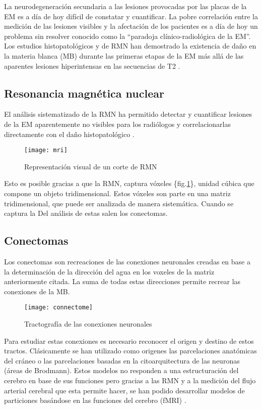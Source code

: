 \documentclass[fleqn,10pt]{UICArticle} %
\begin{document}
La neurodegeneración secundaria a las lesiones provocadas por las placas de la EM es a día de hoy difícil de constatar y cuantificar. La pobre correlación entre la medición de las lesiones visibles y la afectación de los pacientes es a día de hoy un problema sin resolver conocido como la “paradoja clínico-radiológica de la EM”. Los estudios histopatológicos y de RMN han demostrado la existencia de daño en la materia blanca (MB) durante las primeras etapas de la EM más allá de las aparentes lesiones hiperintensas en las secuencias de T2 \cite{Beer2016}.

\subsection{Resonancia magnética nuclear}

El análisis sistematizado de la RMN ha permitido detectar y cuantificar lesiones de la EM aparentemente no visibles para los radiólogos y correlacionarlas directamente con el daño histopatológico \cite{Beer2016}.

\begin{figure}[ht]
	\centering
	\texttt{[image: mri]}
	\caption{Representación visual de un corte de RMN}
	\label{fig:voxeles}
\end{figure}

Esto es posible gracias a que la RMN, captura vóxeles \{fig.\ref{fig:voxeles}\}, unidad cúbica que compone un objeto tridimensional. Estos vóxeles son parte en una matriz tridimensional, que puede ser analizada de manera sistemática. Cuando se captura la Del análisis de estas salen los conectomas.





\subsection{Conectomas}
Los conectomas son recreaciones de las conexiones neuronales creadas en base a la determinación de la dirección del agua en los voxeles de la matriz anteriormente citada. La suma de todas estas direcciones permite recrear las conexiones de la MB.

\begin{figure}[ht]
	\centering
	\texttt{[image: connectome]}
	\caption{Tractografía de las conexiones neuronales}
	\label{fig:connectome}
\end{figure}

Para estudiar estas conexiones es necesario reconocer el origen y destino de estos tractos. Clásicamente se han utilizado como origenes las parcelaciones anatómicas del cráneo o las parcelaciones basadas en la citoarquitectura de las neuronas (áreas de Brodmann). Estos modelos no responden a una estructuración del cerebro en base de sus funciones pero gracias a las RMN y a la medición del flujo arterial cerebral que esta permite hacer, se han podido desarrollar modelos de particiones basándose en las funciones del cerebro (fMRI) \cite{Ogawa1990}.
\end{document}

